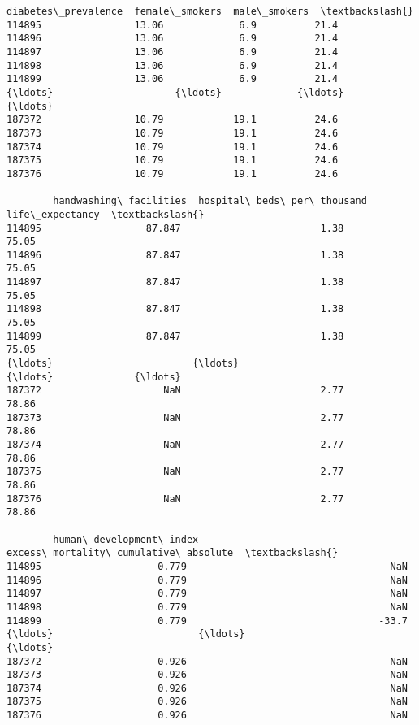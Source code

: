 \documentclass[11pt]{article}
\begin{document}
\begin{tcolorbox}[breakable, size=fbox, boxrule=.5pt, pad at break*=1mm, opacityfill=0]
\begin{Verbatim}[commandchars=\\\{\}]
        diabetes\_prevalence  female\_smokers  male\_smokers  \textbackslash{}
114895                13.06             6.9          21.4
114896                13.06             6.9          21.4
114897                13.06             6.9          21.4
114898                13.06             6.9          21.4
114899                13.06             6.9          21.4
{\ldots}                     {\ldots}             {\ldots}           {\ldots}
187372                10.79            19.1          24.6
187373                10.79            19.1          24.6
187374                10.79            19.1          24.6
187375                10.79            19.1          24.6
187376                10.79            19.1          24.6

        handwashing\_facilities  hospital\_beds\_per\_thousand  life\_expectancy  \textbackslash{}
114895                  87.847                        1.38            75.05
114896                  87.847                        1.38            75.05
114897                  87.847                        1.38            75.05
114898                  87.847                        1.38            75.05
114899                  87.847                        1.38            75.05
{\ldots}                        {\ldots}                         {\ldots}              {\ldots}
187372                     NaN                        2.77            78.86
187373                     NaN                        2.77            78.86
187374                     NaN                        2.77            78.86
187375                     NaN                        2.77            78.86
187376                     NaN                        2.77            78.86

        human\_development\_index  excess\_mortality\_cumulative\_absolute  \textbackslash{}
114895                    0.779                                   NaN
114896                    0.779                                   NaN
114897                    0.779                                   NaN
114898                    0.779                                   NaN
114899                    0.779                                 -33.7
{\ldots}                         {\ldots}                                   {\ldots}
187372                    0.926                                   NaN
187373                    0.926                                   NaN
187374                    0.926                                   NaN
187375                    0.926                                   NaN
187376                    0.926                                   NaN


\end{Verbatim}
\end{tcolorbox}
\end{document}
